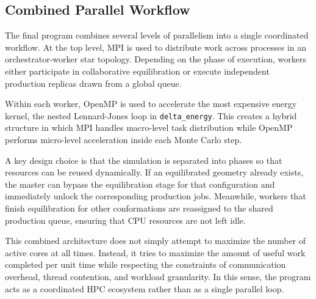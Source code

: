 \subsection{Combined Parallel Workflow}

The final program combines several levels of parallelism into a single
coordinated workflow. At the top level, MPI is used to distribute work
across processes in an orchestrator-worker star topology. Depending on
the phase of execution, workers either participate in collaborative
equilibration or execute independent production replicas drawn from a
global queue.

Within each worker, OpenMP is used to accelerate the most expensive
energy kernel, the nested Lennard-Jones loop in
\texttt{delta\_energy}. This creates a hybrid structure in which MPI
handles macro-level task distribution while OpenMP performs
micro-level acceleration inside each Monte Carlo step.

A key design choice is that the simulation is separated into phases so
that resources can be reused dynamically. If an equilibrated geometry
already exists, the master can bypass the equilibration stage for that
configuration and immediately unlock the corresponding production jobs.
Meanwhile, workers that finish equilibration for other conformations are
reassigned to the shared production queue, ensuring that CPU resources
are not left idle.

This combined architecture does not simply attempt to maximize the
number of active cores at all times. Instead, it tries to maximize the
amount of useful work completed per unit time while respecting the
constraints of communication overhead, thread contention, and workload
granularity. In this sense, the program acts as a coordinated HPC
ecosystem rather than as a single parallel loop.
